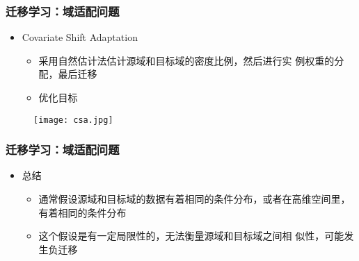 \begin{frame}
    \frametitle{迁移学习：域适配问题}
    \begin{itemize}
        \item Covariate Shift Adaptation 
            \begin{itemize}
                \item 采用自然估计法估计源域和目标域的密度比例，然后进行实 例权重的分配，最后迁移
                \item 优化目标
            \end{itemize}
    \end{itemize}
    \begin{figure}
        \texttt{[image: csa.jpg]}
    \end{figure}
\end{frame}

\begin{frame}
    \frametitle{迁移学习：域适配问题}
    \begin{itemize}
        \item 总结
        \begin{itemize}
            \item 通常假设源域和目标域的数据有着相同的条件分布，或者在高维空间里，有着相同的条件分布
            \item 这个假设是有一定局限性的，无法衡量源域和目标域之间相 似性，可能发生负迁移
        \end{itemize}
    \end{itemize}
\end{frame}